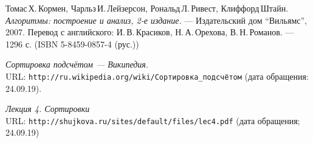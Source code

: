 \begin{thebibliography}{99}

Томас\,Х.\,Кормен, Чарльз\,И.\,Лейзерсон, Рональд\,Л.\,Ривест, Клиффорд\,Штайн.
{\itshape Алгоритмы: построение и анализ, 2-е издание.} --- Издательский дом \enquote{Вильямс}, 2007. Перевод с английского: И.\,В.\,Красиков, Н.\,А.\,Орехова, В.\,Н.\,Романов. --- 1296 с. (ISBN 5-8459-0857-4 (рус.))

{\itshape Сортировка подсчётом — Википедия.} \\URL: \texttt{http://ru.wikipedia.org/wiki/Сортировка\_подсчётом} (дата обращения: 24.09.19).

{\itshape Лекция 4. Сортировки} \\URL: \texttt{http://shujkova.ru/sites/default/files/lec4.pdf} (дата обращения; 24.09.19)

\end{thebibliography}
\pagebreak